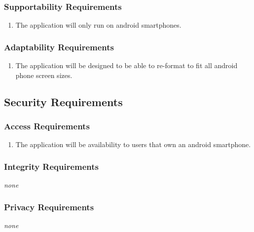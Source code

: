 \documentclass[12pt, titlepage]{article}
\begin{document}
\subsubsection{Supportability Requirements}
\label{ssub:supportability_requirements}
\begin{enumerate}[{MS}2. ]
	\item The application will only run on android smartphones.
\end{enumerate}

\subsubsection{Adaptability Requirements}
\label{ssub:adaptability_requirements}
\begin{enumerate}[{MS}3. ]
	\item The application will be designed to be able to re-format to fit all android phone screen sizes.
\end{enumerate}


\subsection{Security Requirements}
\label{sub:security_requirements}

\subsubsection{Access Requirements}
\label{ssub:access_requirements}
\begin{enumerate}[{SR}1. ]
	\item The application will be availability to users that own an android smartphone.
\end{enumerate}

\subsubsection{Integrity Requirements}
\label{ssub:integrity_requirements}
\emph{none}

\subsubsection{Privacy Requirements}
\label{ssub:privacy_requirements}
\emph{none}
\end{document}
